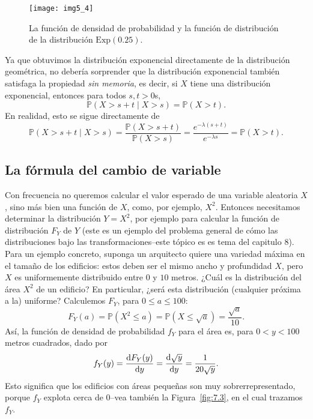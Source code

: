 	\begin{figure}[!ht]
		\centering
		\texttt{[image: img5\_4]}
		\caption{La función de densidad de probabilidad y la función de distribución de la distribución $\mathrm{Exp}\left(\num{0.25}\right)$.}
		\label{fig:5.4}
	\end{figure}

	Ya que obtuvimos la distribución exponencial directamente de la distribución geométrica, no debería sorprender que la distribución exponencial también satisfaga la propiedad \textit{sin memoria}, es decir, si $X$ tiene una distribución exponencial, entonces para todos $s,t>0$s,
	\[
		\mathds{P}\left(X>s+t\mid X>s\right)=\mathds{P}\left(X>t\right).
	\]
	En realidad, esto se sigue directamente de
	\[
		\mathds{P}\left(X>s+t\mid X>s\right)=\frac{\mathds{P}\left(X>s+t\right)}{\mathds{P}\left(X>s\right)}=\frac{e^{-\lambda\left(s+t\right)}}{e^{-\lambda s}}
		=\mathds{P}\left(X>t\right).
	\]

\subsection{La fórmula del cambio de variable}\label{subsec:change}

	Con frecuencia no queremos calcular el valor esperado de una variable aleatoria $X$, sino más bien una función de $X$, como, por ejemplo, $X^2$. Entonces necesitamos determinar la distribución $Y=X^2$, por ejemplo para calcular la función de distribución $F_Y$ de $Y$ (este es un ejemplo del problema general de cómo las distribuciones bajo las transformaciones--este tópico es es tema del capitulo 8). Para un ejemplo concreto, suponga un arquitecto quiere una variedad máxima en el tamaño de los edificios: estos deben ser el mismo ancho y profundidad $X$, pero $X$ es uniformemente distribuido entre $0$ y $10$ metros. ¿Cuál es la distribución del área $X^2$ de un edificio? En particular, ¿será esta distribución (cualquier próxima a la) uniforme? Calculemos $F_Y$, para $0\le a\le 100$:
	\[
		F_Y(a)=\mathds{P}\left(X^2\le a\right)=\mathds{P}\left(X\le\sqrt{a}\right)=\frac{\sqrt{a}}{10}.
	\]
	Así, la función de densidad de probabilidad $f_Y$ para el área es, para $0<y<100$ metros cuadrados, dado por
	\begin{equation}\label{eq:7.1}
		f_Y(y)=\diff{F_Y(y)}{y}=\diff{\sqrt{y}}{y}=\frac{1}{20\sqrt{y}}.
	\end{equation}
	Esto significa que los edificios con áreas pequeñas son muy sobrerrepresentado, porque $f_Y$ explota cerca de 0--vea también la Figura~\ref{fig:7.3}, en el cual trazamos $f_Y$.

